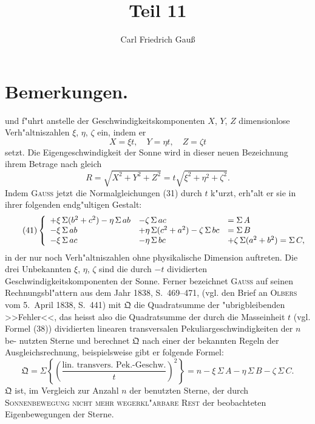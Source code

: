 \documentclass[12pt,a4paper]{article}
\title{Teil 11}
\author{Carl Friedrich Gau\ss}
\date{}
\theoremstyle{plain}
\theoremstyle{definition}
\theoremstyle{remark}
\begin{document}
\maketitle

\section*{Bemerkungen.}

und f"uhrt anstelle der Geschwindigkeitskomponenten $X$, $Y$, $Z$ dimensionlose Verh"altniszahlen $\xi$, $\eta$, $\zeta$ ein,
indem er
\begin{equation}\tag{39}
X = \xi t,\quad Y = \eta t,\quad Z = \zeta t
\end{equation}
setzt. Die Eigengeschwindigkeit der Sonne wird in dieser neuen Bezeichnung ihrem Betrage nach gleich
\begin{equation}\tag{40}
R = \sqrt{X^2 + Y^2 + Z^2} = t\sqrt{\xi^2 + \eta^2 + \zeta^2}.
\end{equation}
Indem \textsc{Gauss} jetzt die Normalgleichungen (31) durch $t$ k"urzt, erh"alt er sie in ihrer folgenden endg"ultigen
Gestalt:
\begin{equation}\tag{41}
\left\{
\begin{array}{l@{\quad}l@{\quad}l}
+\xi\,\Sigma(b^2+c^2) - \eta\,\Sigma\,ab & - \zeta\,\Sigma\,ac & = \Sigma\,A\\
-\xi\,\Sigma\,ab & + \eta\,\Sigma(c^2+a^2) - \zeta\,\Sigma\,bc & = \Sigma\,B\\
-\xi\,\Sigma\,ac & - \eta\,\Sigma\,bc & + \zeta\,\Sigma(a^2+b^2) = \Sigma\,C,
\end{array}
\right.
\end{equation}
in der nur noch Verh"altniszahlen ohne physikalische Dimension auftreten. Die drei Unbekannten $\xi$, $\eta$, $\zeta$ sind
die durch $-t$ dividierten Geschwindigkeitskomponenten der Sonne. Ferner bezeichnet \textsc{Gauss} auf seinen
Rechnungsbl"attern aus dem Jahr 1838, S.~469--471, (vgl. den Brief an \textsc{Olbers} vom 5.~April 1838, S.~441)
mit $\mathfrak{Q}$ die Quadratsumme der "ubrigbleibenden >>Fehler<<, das heisst also die Quadratsumme der durch die
Masseinheit $t$ (vgl. Formel (38)) dividierten linearen transversalen Pekuliargeschwindigkeiten der $n$ be-
nutzten Sterne und berechnet $\mathfrak{Q}$ nach einer der bekannten Regeln der Ausgleichsrechnung, beispielsweise
gibt er folgende Formel:
\begin{equation}\tag{42}
\mathfrak{Q} = \Sigma\left\{\left(\frac{\text{lin.\ transvers.\ Pek.-Geschw.}}{t}\right)^2\right\} = n - \xi\,\Sigma\,A - \eta\,\Sigma\,B - \zeta\,\Sigma\,C.
\end{equation}
$\mathfrak{Q}$ ist, im Vergleich zur Anzahl $n$ der benutzten Sterne, der durch \textsc{Sonnenbewegung nicht mehr
wegerkl"arbare Rest} der beobachteten Eigenbewegungen der Sterne.
\end{document}
